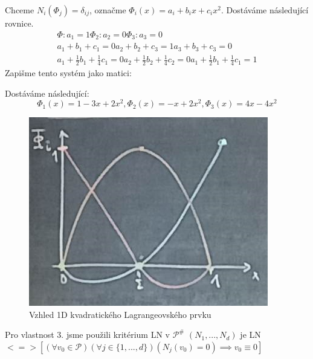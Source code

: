 \documentclass[../main.tex]{subfiles}
\begin{document}
\begin{definition}
Chceme $N_i(\Phi_j) = \delta_{ij}$, označme $\Phi_i(x) = a_i + b_ix + c_ix^2$.
Dostáváme následující rovnice.
\begin{multline}
    \Phi:  a_1 = 1                                 \Phi_2:    a_2 = 0                                 \Phi_3:    a_3 = 0             \\
            a_1 + b_1 + c_1 = 0                                 a_2 + b_2 + c_3 = 1                                 a_3 + b_3 + c_3 = 0 \\
            a_1 + \frac{1}{2}b_1 + \frac{1}{4}c_1 = 0           a_2 + \frac{1}{2}b_2 + \frac{1}{4}c_2 = 0           a_1 + \frac{1}{2}b_1 + \frac{1}{4}c_1 = 1
\end{multline}
Zapišme tento systém jako matici:


Dostáváme následující:
\begin{equation}
    \Phi_1(x) = 1-3x+2x^2, \Phi_2(x) = -x + 2x^2, \Phi_3(x) = 4x - 4x^2 
\end{equation}

\begin{figure}[ht]
    \centering
    \includegraphics{images/vzhled1dlagrangeprvkukvadraticky.png}
    \caption{Vzhled 1D kvadratického Lagrangeovského prvku}
\end{figure}

\end{definition}

\begin{remark}
    Pro vlastnost 3. jsme použili kritérium LN v $\mathcal{P}^\#$ \break
    $(N_1, ..., N_d)$ je LN $<=> \left[  (\forall v_0 \in \mathcal{P})(\forall j \in \{1,...,d\})(N_j(v_0) = 0) \implies v_0 \equiv 0       \right]$ 
\end{remark}
\end{document}
